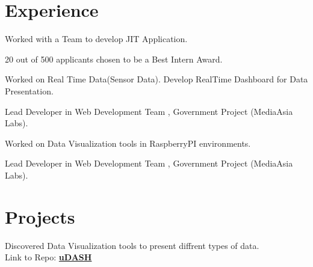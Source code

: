 \documentclass[]{deedy-resume-openfont}
\begin{document}
\hfill
\begin{minipage}[t]{0.66\textwidth} 


\section{Experience}

\vspace{\topsep} %
\begin{tightemize}\item Worked with a Team to develop JIT Application.\\
\item 20 out of 500 applicants chosen to be a Best Intern Award.
\end{tightemize}
\sectionsep

\begin{tightemize}
\item Worked on Real Time Data(Sensor Data). Develop RealTime Dashboard for Data Presentation.
\item Lead Developer in Web Development Team , Government Project (MediaAsia Labs).  
\end{tightemize}
\sectionsep

\begin{tightemize}
\item Worked on Data Visualization tools in RaspberryPI environments. 
\item Lead Developer in Web Development Team , Government Project (MediaAsia Labs).  
\end{tightemize}
\sectionsep


\section{Projects}
Discovered Data Visualization tools to present diffrent types of data.  \\
Link to Repo: \textbf{\href{https://github.com/Apex1000/offlineMCS_V.2}{uDASH}}
\sectionsep


\end{minipage}
\end{document}
